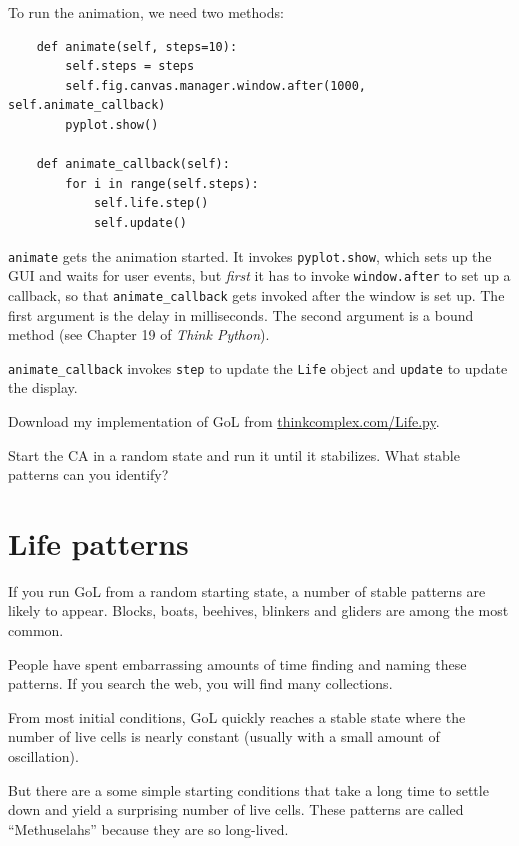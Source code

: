 \documentclass[10pt]{book}
\begin{document}
To run the animation, we need two methods:

\begin{verbatim}
    def animate(self, steps=10):
        self.steps = steps
        self.fig.canvas.manager.window.after(1000, self.animate_callback)
        pyplot.show()

    def animate_callback(self):
        for i in range(self.steps):
            self.life.step()
            self.update()
\end{verbatim}

{\tt animate} gets the animation started.  It invokes {\tt pyplot.show},
which sets up the GUI and waits for user events, but {\em first} it has
to invoke {\tt window.after} to set up a callback, so that
\verb"animate_callback" gets invoked after the window is set up.
The first argument is the delay in milliseconds.  The second
argument is a bound method (see Chapter 19 of {\em Think Python}).

\verb"animate_callback" invokes {\tt step} to update the {\tt Life}
object and {\tt update} to update the display.

\begin{exercise}

Download my implementation of GoL from \url{thinkcomplex.com/Life.py}.

Start the CA in a random state and run it until it stabilizes.
What stable patterns can you identify?

\end{exercise}


\section{Life patterns}

If you run GoL from a random starting state, a number of stable
patterns are likely to appear.  Blocks, boats, beehives, blinkers and
gliders are among the most common.

People have spent embarrassing
amounts of time finding and naming these patterns.  If you search
the web, you will find many collections.

From most initial conditions, GoL quickly reaches a stable
state where the number of live cells is nearly constant
(usually with a small amount of oscillation).

But there are a some simple starting conditions that take a
long time to settle down and yield a surprising
number of live cells.  These patterns are called ``Methuselahs''
because they are so long-lived.
\end{document}
